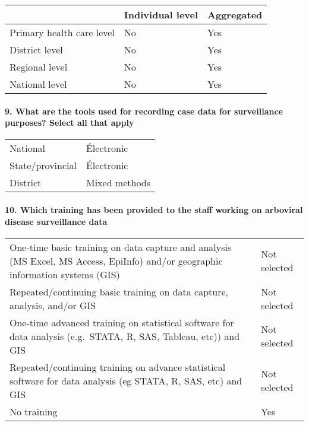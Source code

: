 \documentclass[
]{article}
\begin{document}
\begin{longtable}[]{@{}lll@{}}
\toprule
& Individual level & Aggregated \\
\midrule
\endhead
Primary health care level & No & Yes \\
District level & No & Yes \\
Regional level & No & Yes \\
National level & No & Yes \\
\bottomrule
\end{longtable}

\hypertarget{what-are-the-tools-used-for-recording-case-data-for-surveillance-purposes-select-all-that-apply}{%
\paragraph{9. What are the tools used for recording case data for
surveillance purposes? Select all that
apply}\label{what-are-the-tools-used-for-recording-case-data-for-surveillance-purposes-select-all-that-apply}}

\begin{longtable}[]{@{}ll@{}}
\toprule
\endhead
National & Électronic \\
State/provincial & Électronic \\
District & Mixed methods \\
\bottomrule
\end{longtable}

\hypertarget{which-training-has-been-provided-to-the-staff-working-on-arboviral-disease-surveillance-data}{%
\paragraph{10. Which training has been provided to the staff working on
arboviral disease surveillance
data}\label{which-training-has-been-provided-to-the-staff-working-on-arboviral-disease-surveillance-data}}

\begin{longtable}[]{@{}
  >{\raggedright\arraybackslash}p{}
  >{\raggedright\arraybackslash}p{}@{}}
\toprule
\endhead
One-time basic training on data capture and analysis (MS Excel, MS
Access, EpiInfo) and/or geographic information systems (GIS) & Not
selected \\
Repeated/continuing basic training on data capture, analysis, and/or GIS
& Not selected \\
One-time advanced training on statistical software for data analysis
(e.g.~STATA, R, SAS, Tableau, etc)) and GIS & Not selected \\
Repeated/continuing training on advance statistical software for data
analysis (eg STATA, R, SAS, etc) and GIS & Not selected \\
No training & Yes \\
\bottomrule
\end{longtable}
\end{document}

